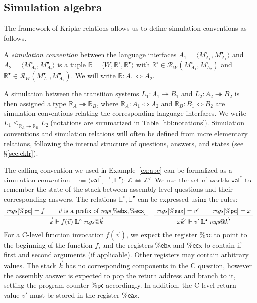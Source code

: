 \documentclass[acmsmall,authordraft]{acmart}
\newcommand{\kw}[1]{\ensuremath{ \mathsf{#1} }}
\newcommand{\que}{\circ}
\newcommand{\ans}{\bullet}
\begin{document}
\subsection{Simulation algebra} %

The framework of Kripke relations allows us
to define simulation conventions as follows.

\begin{definition} \label{def:simconv} %
A \emph{simulation convention} between the language interfaces
$A_1 = \langle M_{A_1}^\que, M_{A_1}^\ans \rangle$ and
$A_2 = \langle M_{A_2}^\que, M_{A_2}^\ans \rangle$
is a tuple $\mathbb{R} = \langle W, \mathbb{R}^\que, \mathbb{R}^\ans \rangle$
with $\mathbb{R}^\que \in \mathcal{R}_W(M_{A_1}^\que, M_{A_2}^\que)$
and $\mathbb{R}^\ans \in \mathcal{R}_W(M_{A_1}^\ans, M_{A_2}^\ans)$.
We will write $\mathbb{R} : A_1 \Leftrightarrow A_2$.
\end{definition}

A simulation between the transition systems
$L_1 : A_1 \twoheadrightarrow B_1$ and
$L_2 : A_2 \twoheadrightarrow B_2$
is then assigned a type $\mathbb{R}_A \twoheadrightarrow \mathbb{R}_B$,
where %
$\mathbb{R}_A : A_1 \Leftrightarrow A_2$ and
$\mathbb{R}_B : B_1 \Leftrightarrow B_2$
are simulation conventions
relating the corresponding language interfaces.
We write
$L_1 \le_{\mathbb{R}_A \twoheadrightarrow \mathbb{R}_B} L_2$
(notations are summarized in Table~\ref{tbl:notations}).
Simulation conventions and simulation relations
will often be defined from
more elementary relations,
following the internal structure of questions, answers, and states
(see \S\ref{sec:cklr}).

\begin{example} %
The calling convention we used in Example~\ref{ex:abc}
can be formalized as a simulation convention
$\mathbb{L} :=
  \langle \kw{val}^*, \mathbb{L}^\que, \mathbb{L}^\ans \rangle :
    \mathcal{L} \Leftrightarrow \mathcal{L}'$.
We use the set of worlds $\kw{val}^*$
to remember the state of the stack between
assembly-level questions and their corresponding answers.
The relations $\mathbb{L}^\que, \mathbb{L}^\ans$
can be expressed using the rules:
\[
  \AxiomC{$\mathit{regs}[\kw{\%pc}] = f$}
  \AxiomC{$\vec{v} \text{ is a prefix of } \mathit{regs}[\kw{\%ebx}, \kw{\%ecx}]$}
  \BinaryInfC{$
    \vec{k} \Vdash
    f(\vec{v}) \mathrel{\mathbb{L}^\que} \mathit{regs}@\vec{k}
  $}
  \DisplayProof
  \quad
  \AxiomC{$\mathit{regs}[\kw{\%eax}] = v'$}
  \AxiomC{$\mathit{regs}[\kw{\%pc}] = x$}
  \BinaryInfC{$
    x \vec{k}' \Vdash
    v' \mathrel{\mathbb{L}^\ans} \mathit{regs}@\vec{k}'
  $}
  \DisplayProof
\]
For a C-level function invocation $f(\vec{v})$,
we expect the register $\kw{\%pc}$ to point to
the beginning of the function $f$,
and the registers $\kw{\%ebx}$ and $\kw{\%ecx}$
to contain if first and second arguments (if applicable).
Other registers may contain arbitrary values.
The stack $\vec{k}$ has no corresponding components in the C question,
however the assembly answer is expected to pop the return address
and branch to it, setting the program counter $\kw{\%pc}$ accordingly.
In addition,
the C-level return value $v'$ must be stored
in the register $\kw{\%eax}$.
\end{example}
\end{document}
